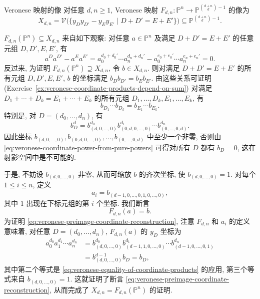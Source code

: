 \begin{Proposition}{Veronese 映射的像}\leavevmode\label{prop:veronese-image-defined-by-quadratics}
对任意 $d,n\ge1$, Veronese 映射 $F_{d,n}:\mathbb{P}^{n}\to\mathbb{P}^{\binom{d+n}{d}-1}$ 的像为
\[
  X_{d,n}
  =\mathcal{V}\bigl(\{y_{D}y_{D'}-y_{E}y_{E'}\mid D+D'=E+E'\}\bigr)
  \subseteq\mathbb{P}^{\binom{d+n}{d}-1}.
\]
\end{Proposition}
\begin{Proof}
$F_{d,n}(\mathbb{P}^{n})\subseteq X_{d,n}$ 来自如下观察: 对任意 $a\in\mathbb{P}^{n}$ 及满足 $D+D'=E+E'$ 的任意元组 $D,D',E,E'$, 有
\[
  a^{D}a^{D'}-a^{E}a^{E'}
  =a_{0}^{d_{0}+d_{0}'}\cdots a_{n}^{d_{n}+d_{n}'}
   -a_{0}^{e_{0}+e_{0}'}\cdots a_{n}^{e_{n}+e_{n}'}=0.
\]
反过来, 为证明 $F_{d,n}(\mathbb{P}^{n})\supseteq X_{d,n}$, 令 $b\in X_{d,n}$. 则对满足 $D+D'=E+E'$ 的所有元组 $D,D',E,E'$, $b$ 的坐标满足 $b_{D}b_{D'}=b_{E}b_{E'}$. 由这些关系可证明 (Exercise~\ref{ex:veronese-coordinate-products-depend-on-sum}) 对满足 $D_{1}+\cdots+D_{k}=E_{1}+\cdots+E_{k}$ 的所有元组 $D_{1},\ldots,D_{k},E_{1},\ldots,E_{k}$, 有
\begin{equation}\label{eq:veronese-equality-of-coordinate-products}
  b_{D_{1}}\cdots b_{D_{k}}=b_{E_{1}}\cdots b_{E_{k}}.
\end{equation}
特别是, 对 $D=(d_{0},\ldots,d_{n})$, 有
\begin{equation}\label{eq:veronese-coordinate-power-from-pure-powers}
  b_{D}^{d}=b_{(d,0,\ldots,0)}^{d_{0}}b_{(0,d,0,\ldots,0)}^{d_{1}}
  \cdots b_{(0,\ldots,0,d)}^{d_{n}}.
\end{equation}
因此坐标 $b_{(d,0,\ldots,0)},b_{(0,d,0,\ldots,0)},\ldots,b_{(0,\ldots,0,d)}$ 中至少一个非零, 否则由 \eqref{eq:veronese-coordinate-power-from-pure-powers} 可得对所有 $D$ 都有 $b_{D}=0$, 这在射影空间中是不可能的.

于是, 不妨设 $b_{(d,0,\ldots,0)}$ 非零, 从而可缩放 $b$ 的齐次坐标, 使 $b_{(d,0,\ldots,0)}=1$. 对每个 $1\le i\le n$, 定义
\[
  a_{i}=b_{(d-1,0,\ldots,0,1,0,\ldots,0)},
\]
其中 $1$ 出现在下标元组的第 $i$ 个坐标. 我们断言
\begin{equation}\label{eq:veronese-preimage-coordinate-reconstruction}
  F_{d,n}(a)=b.
\end{equation}
为证明 \eqref{eq:veronese-preimage-coordinate-reconstruction}, 注意 $F_{d,n}$ 和 $a_{i}$ 的定义意味着, 对任意 $D=(d_{0},\ldots,d_{n})$, $F_{d,n}(a)$ 的 $y_{D}$ 坐标为
\[
  \begin{aligned}
  a_{0}^{d_{0}}a_{1}^{d_{1}}\cdots a_{n}^{d_{n}}
    &=b_{(d,0,\ldots,0)}^{d_{0}}b_{(d-1,1,0,\ldots,0)}^{d_{1}}
      \cdots b_{(d-1,0,\ldots,0,1)}^{d_{n}}\\
    &=b_{(d,0,\ldots,0)}^{d-1}b_{D}=b_{D},
  \end{aligned}
\]
其中第二个等式是 \eqref{eq:veronese-equality-of-coordinate-products} 的应用, 第三个等式来自 $b_{(d,0,\ldots,0)}=1$. 这就证明了断言 \eqref{eq:veronese-preimage-coordinate-reconstruction}, 从而完成了 $X_{d,n}=F_{d,n}(\mathbb{P}^{n})$ 的证明.
\end{Proof}

